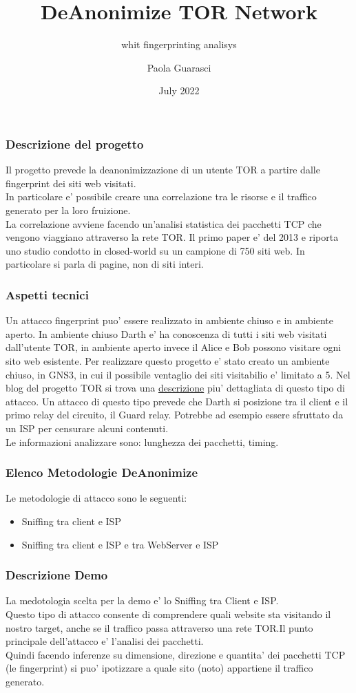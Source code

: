 \documentclass{beamer}[10pt]
\title[DeAnonTor]{DeAnonimize TOR Network}
\subtitle[]{whit fingerprinting analisys}
\author[Paola Guarasci]{Paola Guarasci}
\date[07/2022]{July 2022}
\begin{document}
\frame{\titlepage}

\begin{frame}
  \frametitle{Descrizione del progetto}
  Il progetto prevede la deanonimizzazione di un utente TOR a partire dalle fingerprint dei siti web visitati.
  \\In particolare e' possibile creare una correlazione tra le risorse e il traffico generato per la loro fruizione.
  \\La correlazione avviene facendo un'analisi statistica dei pacchetti TCP che vengono viaggiano attraverso la rete TOR.\@
  Il primo paper e' del 2013 e riporta uno studio condotto in closed-world su un campione di 750 siti web. In particolare si parla di pagine, non di siti interi. 
\end{frame}

\begin{frame}
  \frametitle{Aspetti tecnici}
  Un attacco fingerprint puo' essere realizzato in ambiente chiuso e in ambiente aperto. In ambiente chiuso Darth e' ha conoscenza di tutti i siti web visitati dall'utente TOR, in ambiente aperto invece il Alice e Bob possono visitare ogni sito web esistente. 
  Per realizzare questo progetto e' stato creato un ambiente chiuso, in GNS3, in cui il possibile ventaglio dei siti visitabilio e' limitato a 5. 
  Nel blog del progetto TOR si trova una \href{https://blog.torproject.org/critique-website-traffic-fingerprinting-attacks/}{descrizione}  piu' dettagliata di questo tipo di attacco. 
  Un attacco di questo tipo prevede che Darth si posizione tra il client e il primo relay del circuito, il Guard relay. Potrebbe ad esempio essere sfruttato da un ISP per censurare alcuni contenuti. 
  \\ Le informazioni analizzare sono: lunghezza dei pacchetti, timing.
\end{frame}

\begin{frame}
  \frametitle{Elenco Metodologie DeAnonimize}
    Le metodologie di attacco sono le seguenti:
    \begin{itemize}
      \item Sniffing tra client e ISP
      \item Sniffing tra client e ISP e tra WebServer e ISP
    \end{itemize}
\end{frame}

\begin{frame}
  \frametitle{Descrizione Demo}
  La medotologia scelta per la demo e' lo Sniffing tra Client e ISP.\@
  \\ Questo tipo di attacco consente di comprendere quali website sta visitando il nostro target, anche se il traffico passa attraverso una rete TOR.\@ Il punto principale dell'attacco e' l'analisi dei pacchetti.\@
  \\ Quindi facendo inferenze su dimensione, direzione e quantita' dei pacchetti TCP (le fingerprint) si puo' ipotizzare a quale sito (noto) appartiene il traffico generato.
\end{frame}
\end{document}
